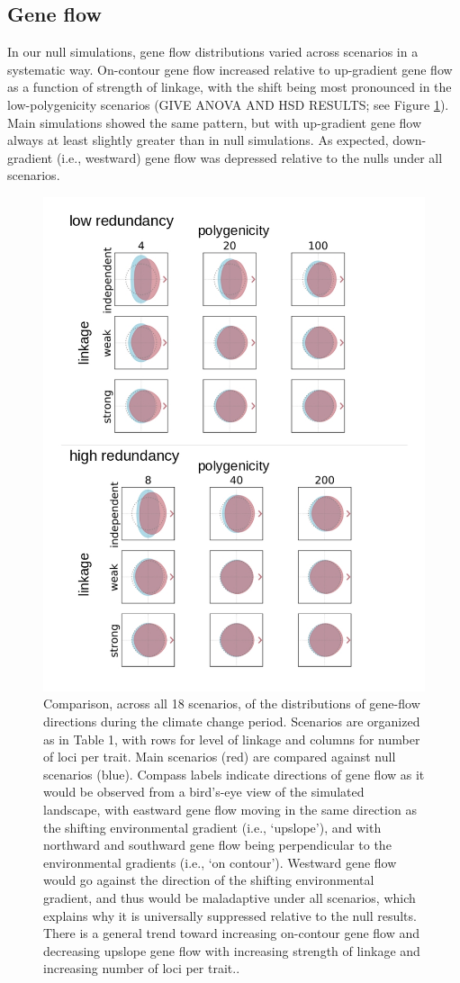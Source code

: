 \documentclass[9pt,twocolumn,twoside,lineno]{pnas-new}
\begin{document}
\subsection{Gene flow}

In our null simulations, gene flow distributions varied across scenarios in a systematic way.
On-contour gene flow increased relative to up-gradient
gene flow as a function of strength of linkage, with the
shift being most pronounced in the low-polygenicity scenarios
(GIVE ANOVA AND HSD RESULTS; see Figure \ref{fig:gene_flow}).
Main simulations showed the same pattern, but with up-gradient gene flow
always at least slightly greater than in null simulations.
As expected, down-gradient (i.e., westward) gene flow was depressed relative to the nulls under all scenarios.


\begin{figure}
\centering
\includegraphics[width=.8\linewidth]{gene_flow_plots.jpg}
\caption{Comparison, across all 18 scenarios, of the distributions of gene-flow directions during the climate change period. Scenarios are organized as in Table 1, with rows for level of linkage and columns for number of loci per trait. Main scenarios (red) are compared against null scenarios (blue). Compass labels indicate directions of gene flow as it would be observed from a bird’s-eye view of the simulated landscape, with eastward gene flow moving in the same direction as the shifting environmental gradient (i.e., ‘upslope’), and with northward and southward gene flow being perpendicular to the environmental gradients (i.e., ‘on contour’). Westward gene flow would go against the direction of the shifting environmental gradient, and thus would be maladaptive under all scenarios, which explains why it is universally suppressed relative to the null results. There is a general trend toward increasing on-contour gene flow and decreasing upslope gene flow with increasing strength of linkage and increasing number of loci per trait..
}
\label{fig:gene_flow}
\end{figure}
\end{document}
